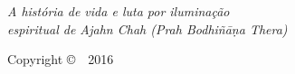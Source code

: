 \cleartorecto
\thispagestyle{empty}
\vspace*{5em}
\newlength\titleLength
\newlength\xheight

{\centering

\settowidth{\titleLength}{%
  {\Huge\chapterTitleFont\scshape\MakeLowercase{\thetitle}}%
}

{\Huge\chapterTitleFont\itshape \thetitle}\\[0.3\baselineskip]
\raisebox{0.5\xheight}{\color[gray]{0.4}\rule{\titleLength}{0.1pt}}\\[0.3\baselineskip]
{\itshape A história de vida e luta por iluminação\\
espiritual de Ajahn Chah (Prah Bodhiñāṇa Thera)}

\vfill

Copyright \copyright\ \thePublisher\ 2016

\vspace*{5em}

}


